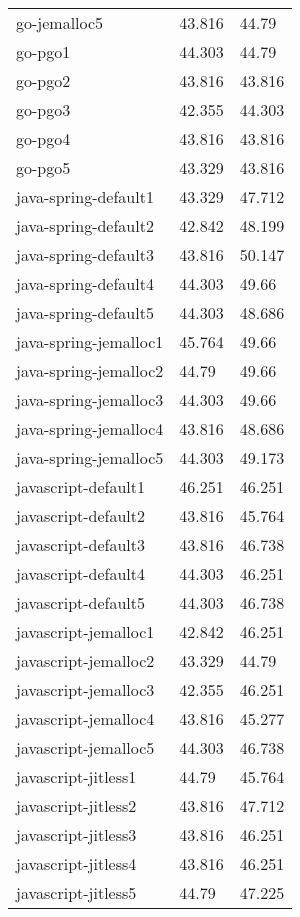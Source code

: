 \begin{longtable}[H]{|lll|}
go-jemalloc5            & 43.816 & 44.79  \\
go-pgo1                 & 44.303 & 44.79  \\
go-pgo2                 & 43.816 & 43.816 \\
go-pgo3                 & 42.355 & 44.303 \\
go-pgo4                 & 43.816 & 43.816 \\
go-pgo5                 & 43.329 & 43.816 \\
java-spring-default1    & 43.329 & 47.712 \\
java-spring-default2    & 42.842 & 48.199 \\
java-spring-default3    & 43.816 & 50.147 \\
java-spring-default4    & 44.303 & 49.66  \\
java-spring-default5    & 44.303 & 48.686 \\
java-spring-jemalloc1   & 45.764 & 49.66  \\
java-spring-jemalloc2   & 44.79  & 49.66  \\
java-spring-jemalloc3   & 44.303 & 49.66  \\
java-spring-jemalloc4   & 43.816 & 48.686 \\
java-spring-jemalloc5   & 44.303 & 49.173 \\
javascript-default1     & 46.251 & 46.251 \\
javascript-default2     & 43.816 & 45.764 \\
javascript-default3     & 43.816 & 46.738 \\
javascript-default4     & 44.303 & 46.251 \\
javascript-default5     & 44.303 & 46.738 \\
javascript-jemalloc1    & 42.842 & 46.251 \\
javascript-jemalloc2    & 43.329 & 44.79  \\
javascript-jemalloc3    & 42.355 & 46.251 \\
javascript-jemalloc4    & 43.816 & 45.277 \\
javascript-jemalloc5    & 44.303 & 46.738 \\
javascript-jitless1     & 44.79  & 45.764 \\
javascript-jitless2     & 43.816 & 47.712 \\
javascript-jitless3     & 43.816 & 46.251 \\
javascript-jitless4     & 43.816 & 46.251 \\
javascript-jitless5     & 44.79  & 47.225 \\

\end{longtable}

